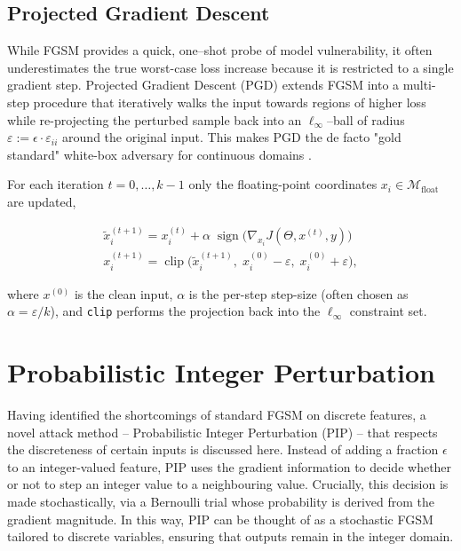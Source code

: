 \subsection{Projected Gradient Descent}

While FGSM provides a quick, one–shot probe of model vulnerability, it often underestimates the true  worst-case loss increase because it is restricted to a single gradient step.  Projected Gradient Descent (PGD) extends FGSM into a multi-step procedure that iteratively walks the input towards regions of higher loss while re-projecting the perturbed sample back into an $\ell_{\infty}$–ball of radius $\varepsilon:=\epsilon\cdot\varepsilon_{ii}$ around the original input. This makes PGD the de facto "gold standard" white-box adversary for continuous domains \cite{madry2019deeplearningmodelsresistant}.

For each iteration $t\!=\!0,\dots,k{-}1$ only the floating-point coordinates
$x_i\!\in\!\mathcal{M}_{\text{float}}$ are updated,

\begin{equation}
\begin{aligned}
\tilde{x}^{(t+1)}_i = x^{(t)}_i
        + \alpha \;\operatorname{sign}\!\bigl(\nabla_{x_i} J(\Theta,x^{(t)},y)\bigr) \\
x^{(t+1)}_i  = \operatorname{clip}\!\bigl(
          \tilde{x}^{(t+1)}_i,\;
          x^{(0)}_i - \varepsilon,\;
          x^{(0)}_i + \varepsilon
        \bigr),                                         
\label{eq:pgd_update}
\end{aligned}
\end{equation}

where $x^{(0)}$ is the clean input, $\alpha$ is the per-step step-size
(often chosen as $\alpha=\varepsilon/k$), and \texttt{clip} performs the projection back into the $\ell_{\infty}$ constraint set.


\section{Probabilistic Integer Perturbation}
\label{sec:intprob_methodology}

Having identified the shortcomings of standard FGSM on discrete features, a novel attack method – Probabilistic Integer Perturbation (PIP) – that respects the discreteness of certain inputs is discussed here. Instead of adding a fraction $\epsilon$ to an integer-valued feature, PIP uses the gradient information to decide whether or not to step an integer value to a neighbouring value. Crucially, this decision is made stochastically, via a Bernoulli trial whose probability is derived from the gradient magnitude. In this way, PIP can be thought of as a stochastic FGSM tailored to discrete variables, ensuring that outputs remain in the integer domain.


